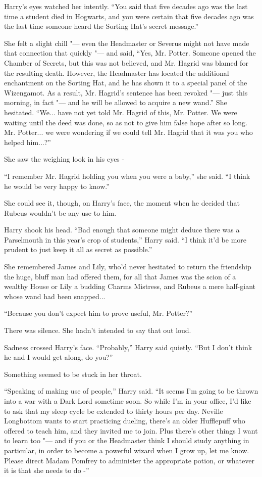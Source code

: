Harry's eyes watched her intently. ``You said that five decades ago was
the last time a student died in Hogwarts, and you were certain that five
decades ago was the last time someone heard the Sorting Hat's secret
message.''

She felt a slight chill "--- even the Headmaster or Severus might not have
made that connection that quickly "--- and said, ``Yes, Mr. Potter. Someone
opened the Chamber of Secrets, but this was not believed, and Mr. Hagrid
was blamed for the resulting death. However, the Headmaster has located
the additional enchantment on the Sorting Hat, and he has shown it to a
special panel of the Wizengamot. As a result, Mr. Hagrid's sentence has
been revoked "--- just this morning, in fact "--- and he will be allowed to
acquire a new wand.'' She hesitated. ``We... have not yet told Mr.
Hagrid of this, Mr. Potter. We were waiting until the deed was done, so
as not to give him false hope after so long. Mr. Potter... we were
wondering if we could tell Mr. Hagrid that it was you who helped
him...?''

She saw the weighing look in his eyes -

``I remember Mr. Hagrid holding you when you were a baby,'' she said.
``I think he would be very happy to know.''

She could see it, though, on Harry's face, the moment when he decided
that Rubeus wouldn't be any use to him.

Harry shook his head. ``Bad enough that someone might deduce there was a
Parselmouth in this year's crop of students,'' Harry said. ``I think
it'd be more prudent to just keep it all as secret as possible.''

She remembered James and Lily, who'd never hesitated to return the
friendship the huge, bluff man had offered them, for all that James was
the scion of a wealthy House or Lily a budding Charms Mistress, and
Rubeus a mere half-giant whose wand had been snapped...

``Because you don't expect him to prove useful, Mr. Potter?''

There was silence. She hadn't intended to say that out loud.

Sadness crossed Harry's face. ``Probably,'' Harry said quietly. ``But I
don't think he and I would get along, do you?''

Something seemed to be stuck in her throat.

``Speaking of making use of people,'' Harry said. ``It seems I'm going
to be thrown into a war with a Dark Lord sometime soon. So while I'm in
your office, I'd like to ask that my sleep cycle be extended to thirty
hours per day. Neville Longbottom wants to start practicing dueling,
there's an older Hufflepuff who offered to teach him, and they invited
me to join. Plus there's other things I want to learn too "--- and if you
or the Headmaster think I should study anything in particular, in order
to become a powerful wizard when I grow up, let me know. Please direct
Madam Pomfrey to administer the appropriate potion, or whatever it is
that she needs to do -''

